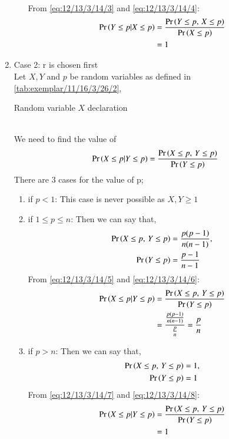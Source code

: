 \documentclass[article]{IEEEtran}
\theoremstyle{remark}
\begin{document}
\begin{enumerate}
\begin{enumerate}
\begin{align}
\end{align}
From \eqref{eq:12/13/3/14/3} and \eqref{eq:12/13/3/14/4}:
\begin{align}
\Pr\left(Y\le p|X\le p\right) &= \frac{\Pr\left(Y \le p, \, X \le p\right)}{\Pr\left(X \le p\right)}\\
&= 1 
\end{align}
\end{enumerate}
\item Case 2: r is chosen first
\\Let $X,Y$ and $p$ be random variables as defined in  \autoref{tab:exemplar/11/16/3/26/2},
\begin{table}[h]
	\centering
	
	\caption{Random variable $X$ declaration}
        \label{tab:exemplar/11/16/3/26/2}
\end{table}
\\We need to find the value of
\begin{align}
\Pr\left(X\le p|Y\le p\right) = \frac{\Pr\left(X \le p, \, Y \le p\right)}{\Pr\left(Y \le p\right)}
\end{align}
There are 3 cases for the value of p;
\begin{enumerate}
\item if $p<1$:
This case is never possible as $X,Y \ge 1$
\item if $1 \le p \le n$:
Then we can say that,
\begin{align}
\Pr\left(X \le p, \, Y \le p\right) &= \frac{p(p-1)}{n(n-1)} \label{eq:12/13/3/14/5},\\
\Pr\left(Y \le p\right) &= \frac{p-1}{n-1} \label{eq:12/13/3/14/6}
\end{align}
From \eqref{eq:12/13/3/14/5} and \eqref{eq:12/13/3/14/6}:
\begin{align}
\Pr\left(X\le p|Y\le p\right) &= \frac{\Pr\left(X \le p, \, Y \le p\right)}{\Pr\left(Y \le p\right)}\\
&= \frac{\frac{p(p-1)}{n(n-1)}}{\frac{p}{n}}
=\frac{p}{n}
\end{align}
\item if $p>n$:
Then we can say that,
\begin{align}
\Pr\left(X \le p, \, Y \le p\right) &= 1 \label{eq:12/13/3/14/7},\\
\Pr\left(Y \le p\right) &= 1 \label{eq:12/13/3/14/8}
\end{align}
From \eqref{eq:12/13/3/14/7} and \eqref{eq:12/13/3/14/8}:
\begin{align}
\Pr\left(X\le p|Y\le p\right) &= \frac{\Pr\left(X \le p, \, Y \le p\right)}{\Pr\left(Y \le p\right)}\\
&= 1 
\end{align}
\end{enumerate}
\end{enumerate}
\end{document}
